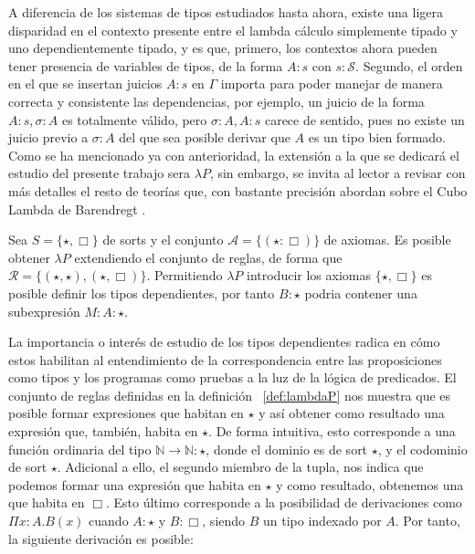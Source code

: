    A diferencia de los sistemas de tipos estudiados hasta ahora, existe una ligera disparidad en el contexto presente entre el lambda cálculo simplemente tipado y uno dependientemente tipado, y es que, primero, los contextos ahora pueden tener presencia de variables de tipos, de la forma $A : s$ con $s : \mathcal{S}$. Segundo, el orden en el que se insertan juicios $A : s$ en $\Gamma$ importa para poder manejar de manera correcta y consistente las dependencias, por ejemplo, un juicio de la forma $A : s, \sigma : A$ es totalmente válido, pero $\sigma : A, A : s$ carece de sentido, pues no existe un juicio previo a $\sigma : A$ del que sea posible derivar que $A$ es un tipo bien formado.
    \newline
    \newline
    \indent Como se ha mencionado ya con anterioridad, la extensión a la que se dedicará el estudio del presente trabajo sera $\lambda P$, sin embargo, se invita al lector a revisar con más detalles el resto de teorías que, con bastante precisión \cite{barthe-coquand} abordan sobre el Cubo Lambda de Barendregt \citep{cube1991}.
\newline
    \begin{definition}\label{def:lambdaP}
      Sea $S =\{\star, \Box\}$ de sorts y el conjunto $\mathcal{A} =\{(\star : \Box)\}$ de axiomas. Es posible obtener $\lambda P$ extendiendo el conjunto de reglas, de forma que $\mathcal{R} = \{(\star, \star), (\star, \Box)\}$. Permitiendo $\lambda P$ introducir los axiomas $\{\star, \Box\}$ es posible definir los tipos dependientes, por tanto $B : \star$ podria contener una subexpresión $M : A : \star$.
    \end{definition}

    La importancia o interés de estudio de los tipos dependientes radica en cómo estos habilitan al entendimiento de la correspondencia entre las proposiciones como tipos y los programas como pruebas a la luz de la lógica de predicados. El conjunto de reglas definidas en la definición ~\ref{def:lambdaP} nos muestra que es posible formar expresiones que habitan en $\star$ y así obtener como resultado una expresión que, también, habita en $\star$. De forma intuitiva, esto corresponde a una función ordinaria del tipo $\mathbb{N}\to\mathbb{N} : \star$, donde el dominio es de sort $\star$, y el codominio de sort $\star$. Adicional a ello, el segundo miembro de la tupla, nos indica que podemos formar una expresión que habita en $\star$ y como resultado, obtenemos una que habita en $\Box$. Esto último corresponde a la posibilidad de derivaciones como $\Pi x : A . B(x)$ cuando $A : \star$ y $B : \Box$, siendo $B$ un tipo indexado por $A$. Por tanto, la siguiente derivación es posible:
    
